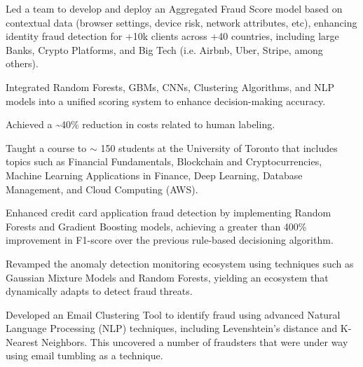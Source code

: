 \documentclass[]{deedy-resume-openfont}
\begin{document}
\begin{tightemize}
\item Led a team to develop and deploy an Aggregated Fraud Score model based on contextual data (browser settings, device risk, network attributes, etc), enhancing identity fraud detection for +10k clients across +40 countries, including large Banks, Crypto Platforms, and Big Tech (i.e. Airbnb, Uber, Stripe, among others).
\item Integrated Random Forests, GBMs, CNNs, Clustering Algorithms, and NLP models into a unified scoring system to enhance decision-making accuracy.
\item Achieved a \textasciitilde40\% reduction in costs related to human labeling.
\end{tightemize}
\sectionsep




\begin{tightemize}
\item Taught a course to $\sim$ 150 students at the University of Toronto that includes topics such as Financial Fundamentals, Blockchain and Cryptocurrencies, Machine Learning Applications in Finance, Deep Learning,  Database Management, and Cloud Computing (AWS).

\end{tightemize}


\sectionsep

\begin{tightemize}
\item Enhanced credit card application fraud detection by implementing Random Forests and Gradient Boosting models, achieving a greater than 400\% improvement in F1-score over the previous rule-based decisioning algorithm.
\item Revamped the anomaly detection monitoring ecosystem using techniques such as Gaussian Mixture Models and Random Forests, yielding an ecosystem that dynamically adapts to detect fraud threats.
\item Developed an Email Clustering Tool to identify fraud using advanced Natural Language Processing (NLP) techniques, including Levenshtein's distance and K-Nearest Neighbors. This uncovered a number of fraudsters that were under way using email tumbling as a technique.
\end{tightemize}
\sectionsep
\end{document}
